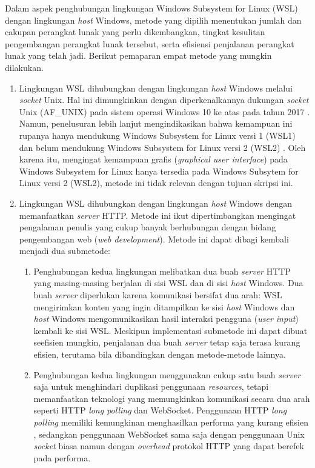 Dalam aspek penghubungan lingkungan Windows Subsystem for Linux (WSL) dengan lingkungan \textit{host} Windows, metode yang dipilih menentukan jumlah dan cakupan perangkat lunak yang perlu dikembangkan, tingkat kesulitan pengembangan perangkat lunak tersebut, serta efisiensi penjalanan perangkat lunak yang telah jadi. Berikut pemaparan empat metode yang mungkin dilakukan.
\begin{enumerate}
    \item Lingkungan WSL dihubungkan dengan lingkungan \textit{host} Windows melalui \textit{socket} Unix. Hal ini dimungkinkan dengan diperkenalkannya dukungan \textit{socket} Unix (AF\_UNIX) pada sistem operasi Windows 10 ke atas pada tahun 2017 \cite{bringing-afunix-to-windows}. Namun, penelusuran lebih lanjut mengindikasikan bahwa kemampuan ini rupanya hanya mendukung Windows Subsystem for Linux versi 1 (WSL1) dan belum mendukung Windows Subsystem for Linux versi 2 (WSL2) \cite{github-issues-afunix-not-supported-in-wsl2}. Oleh karena itu, mengingat kemampuan grafis (\textit{graphical user interface}) pada Windows Subsystem for Linux hanya tersedia pada Windows Subsytem for Linux versi 2 (WSL2), metode ini tidak relevan dengan tujuan skripsi ini.
    
    \item Lingkungan WSL dihubungkan dengan lingkungan \textit{host} Windows dengan memanfaatkan \textit{server} HTTP. Metode ini ikut dipertimbangkan mengingat pengalaman penulis yang cukup banyak berhubungan dengan bidang pengembangan web (\textit{web development}). Metode ini dapat dibagi kembali menjadi dua submetode:
    
    \begin{enumerate}
        \item Penghubungan kedua lingkungan melibatkan dua buah \textit{server} HTTP yang masing-masing berjalan di sisi WSL dan di sisi \textit{host} Windows. Dua buah \textit{server} diperlukan karena komunikasi bersifat dua arah: WSL mengirimkan konten yang ingin ditampilkan ke sisi \textit{host} Windows dan \textit{host} Windows mengomunikasikan hasil interaksi pengguna (\textit{user input}) kembali ke sisi WSL. Meskipun implementasi submetode ini dapat dibuat seefisien mungkin, penjalanan dua buah \textit{server} tetap saja terasa kurang efisien, terutama bila dibandingkan dengan metode-metode lainnya.
        
        \item Penghubungan kedua lingkungan menggunakan cukup satu buah \textit{server} saja untuk menghindari duplikasi penggunaan \textit{resources}, tetapi memanfaatkan teknologi yang memungkinkan komunikasi secara dua arah seperti HTTP \textit{long polling} dan WebSocket. Penggunaan HTTP \textit{long polling} memiliki kemungkinan menghasilkan performa yang kurang efisien \cite{problems-in-http-long-polling}, sedangkan penggunaan WebSocket sama saja dengan penggunaan Unix \textit{socket} biasa namun dengan \textit{overhead} protokol HTTP yang dapat berefek pada performa.
    \end{enumerate}
    

\end{enumerate}
